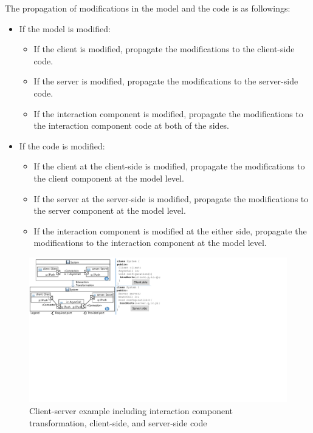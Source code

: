 The propagation of modifications in the model and the code is as followings:
\begin{itemize}
	\itemsep0cm
	\item If the model is modified:
		\begin{itemize}[\footnotesize]
			\itemsep0cm
			\item If the client is modified, propagate the modifications to the client-side code.
			
			\item If the server is modified, propagate the modifications to the server-side code.
			
			\item If the interaction component is modified, propagate the modifications to the interaction component code at both of the sides.
		\end{itemize}	
	
	\item If the code is modified:
		\begin{itemize}[\footnotesize]
			\itemsep0cm
			\item If the client at the client-side is modified, propagate the modifications to the client component at the model level.
			
			\item If the server at the server-side is modified, propagate the modifications to the server component at the model level.
			
			\item If the interaction component is modified at the either side, propagate the modifications to the interaction component at the model level.
		\end{itemize}
\end{itemize} 
 


\begin{figure}
	\centering
	\includegraphics[clip, trim=0cm 11.4cm 16.8cm 0.2cm, width=\columnwidth]{figures/clientserverpapyrus.pdf}
	\caption{Client-server example including interaction component transformation, client-side, and server-side code} 
	\label{fig:clientserverpapyrus}
\end{figure}

